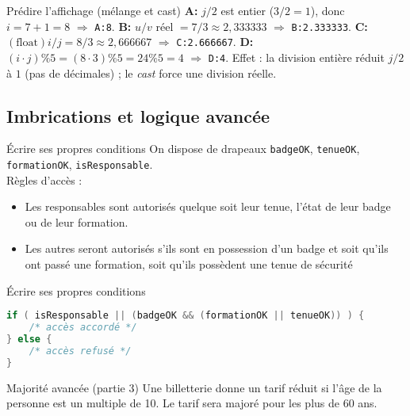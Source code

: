 \begin{UPSTIprofOnlyEnv}
  \begin{UPSTIcorrectionP}{Prédire l'affichage (mélange et cast)}
    \textbf{A:} $j/2$ est entier ($3/2=1$), donc $i=7+1=8$ $\Rightarrow$ \texttt{A:8}.  
    \textbf{B:} $u/v$ réel $=7/3\approx2{,}333333$ $\Rightarrow$ \texttt{B:2.333333}.  
    \textbf{C:} $(\text{float})i/j=8/3\approx2{,}666667$ $\Rightarrow$ \texttt{C:2.666667}.  
    \textbf{D:} $(i\cdot j)\%5=(8\cdot3)\%5=24\%5=4$ $\Rightarrow$ \texttt{D:4}.  
    Effet : la division entière réduit $j/2$ à $1$ (pas de décimales) ; le \textit{cast} force une division réelle.
  \end{UPSTIcorrectionP}
\end{UPSTIprofOnlyEnv}

\subsection{Imbrications et logique avancée}

\begin{UPSTIexercice}{Écrire ses propres conditions}
    On dispose de drapeaux \verb|badgeOK|, \verb|tenueOK|, \verb|formationOK|, \verb|isResponsable|.\\
    Règles d'accès : 
    \begin{itemize}
        \item Les responsables sont autorisés quelque soit leur tenue, l'état de leur badge ou de leur formation. 
        \item Les autres seront autorisés s'ils sont en possession d'un badge et soit qu'ils ont passé une formation, soit qu'ils possèdent une tenue de sécurité
    \end{itemize}
\end{UPSTIexercice}

\begin{UPSTIprofOnlyEnv}
  \begin{UPSTIcorrectionP}{Écrire ses propres conditions}
\begin{lstlisting}[language=C]
if ( isResponsable || (badgeOK && (formationOK || tenueOK)) ) {
    /* accès accordé */
} else {
    /* accès refusé */
}
\end{lstlisting}
  \end{UPSTIcorrectionP}
\end{UPSTIprofOnlyEnv}

\begin{UPSTIexercice}{Majorité avancée (partie 3)}
Une billetterie donne un tarif réduit si l'âge de la personne est un multiple de 10. Le tarif sera majoré pour les plus de 60 ans.
\end{UPSTIexercice}

